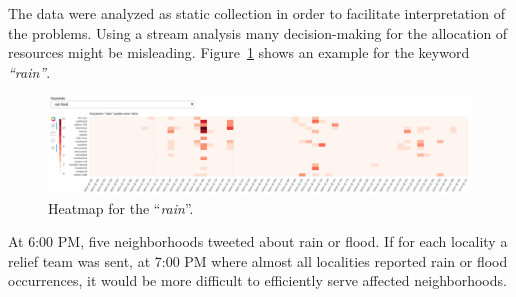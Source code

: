 
The data were analyzed as static collection in order to facilitate
interpretation of the problems. Using a stream analysis many decision-making
for the allocation of resources might be misleading.
Figure~\ref{fig:rain_4_heat} shows an example for the keyword \emph{``rain''}.

\begin{figure}[!h]
    \centering
    \includegraphics[width=1.00\textwidth]{figs/q4/rain_4_heat}
    \caption{Heatmap for the ``\emph{rain}''.}
    \label{fig:rain_4_heat}
\end{figure}


At 6:00 PM, five neighborhoods tweeted about rain or flood. If for each locality a
relief team was sent, at 7:00 PM where almost all localities reported rain or flood
occurrences, it would be more difficult to efficiently serve affected
neighborhoods.
